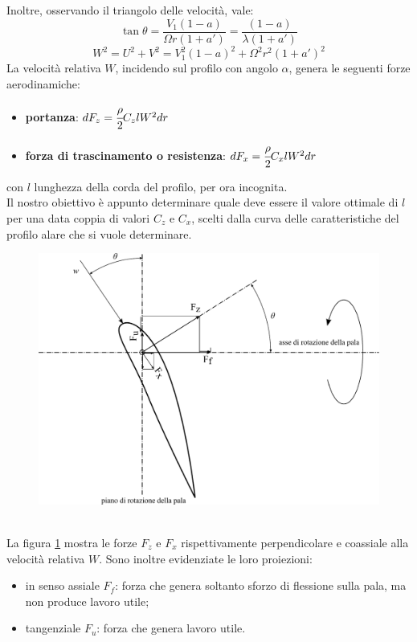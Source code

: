 Inoltre, osservando il triangolo delle velocità, vale:
\begin{equation}\label{eq:tantheta}
\tan \theta = \frac{V_1 \left(1-a \right)}{\Omega r \left(1 + a' \right)} = \frac{\left( 1-a \right)}{\lambda \left( 1 + a' \right)}
\end{equation}
\begin{equation}
	W^2 = U^2 + V^2 = V_1^2 \left(1-a \right)^2 + \Omega^2 r^2 \left( 1+ a' \right)^2
\end{equation}
La velocità relativa $W$, incidendo sul profilo con angolo $\alpha$, genera le seguenti forze aerodinamiche:
\begin{itemize}
	\item \textbf{portanza}: $dF_z = \cfrac{\rho}{2} C_z l W^2 dr$
	\item \textbf{forza di trascinamento o resistenza}: $dF_x = \cfrac{\rho}{2} C_x l W^2 dr$
\end{itemize}
con $l$ lunghezza della corda del profilo, per ora incognita.\\
Il nostro obiettivo è appunto determinare quale deve essere il valore ottimale di $l$ per una data coppia di valori $C_z$ e $C_x$, scelti dalla curva delle caratteristiche del profilo alare che si vuole determinare. 
\begin{figure}[h!]
\centering
  \includegraphics[width=.9\textwidth]{fig/forzeEol.pdf}
\caption{}
\label{fig:forzeEol}
\end{figure}
\\La figura \ref{fig:forzeEol} mostra le forze $F_z$ e $F_x$ rispettivamente perpendicolare e coassiale alla velocità relativa $W$. Sono inoltre evidenziate le loro proiezioni:
\begin{itemize}
	\item in senso assiale $F_f$: forza che genera soltanto sforzo di flessione sulla pala, ma non produce lavoro utile;
	\item tangenziale $F_u$: forza che genera lavoro utile.
\end{itemize}
